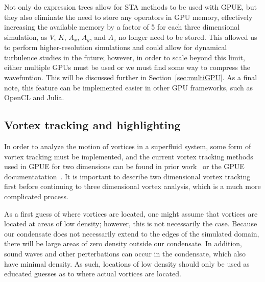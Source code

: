 Not only do expression trees allow for STA methods to be used with GPUE, but they also eliminate the need to store any operators in GPU memory, effectively increasing the available memory by a factor of 5 for each three dimensional simulation, as $V$, $K$, $A_x$, $A_y$, and $A_z$ no longer need to be stored.
This allowed us to perform higher-resolution simulations and could allow for dynamical turbulence studies in the future; however, in order to scale beyond this limit, either multiple GPUs must be used or we must find some way to compress the wavefuntion.
This will be discussed further in Section~\ref{sec:multiGPU}.
As a final note, this feature can be implemented easier in other GPU frameworks, such as OpenCL and Julia.

\subsection{Vortex tracking and highlighting}
\label{sec:tracking}

In order to analyze the motion of vortices in a superfluid system, some form of vortex tracking must be implemented, and the current vortex tracking methods used in GPUE for two dimensions can be found in prior work~\cite{o2017} or the GPUE documentatation~\cite{docs}.
It is important to describe two dimensional vortex tracking first before continuing to three dimensional vortex analysis, which is a much more complicated process.

As a first guess of where vortices are located, one might assume that vortices are located at areas of low density; however, this is not necessarily the case.
Because our condensate does not necessarily extend to the edges of the simulated domain, there will be large areas of zero density outside our condensate.
In addition, sound waves and other perterbations can occur in the condensate, which also have minimal density.
As such, locations of low density should only be used as educated guesses as to where actual vortices are located.

